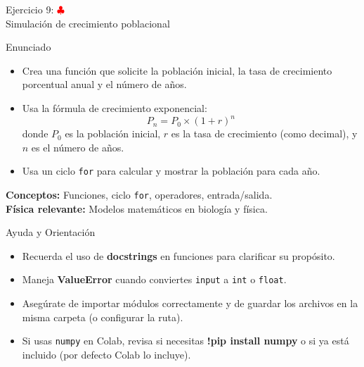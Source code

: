 \documentclass[10pt]{beamer}
\begin{document}

\begin{frame}{Ejercicio 9: \hfill \textcolor{red}{$\clubsuit$} \\ Simulación de crecimiento poblacional}
  \begin{block}{Enunciado}
    \begin{itemize}
      \item Crea una función que solicite la población inicial, la tasa de crecimiento porcentual anual y el número de años.
      \item Usa la fórmula de crecimiento exponencial:
        \[
        P_{n} = P_0 \times (1 + r)^n
        \]
        donde \(P_0\) es la población inicial, \(r\) es la tasa de crecimiento (como decimal), y \(n\) es el número de años.
      \item Usa un ciclo \texttt{for} para calcular y mostrar la población para cada año.
    \end{itemize}
  \end{block}
  \textbf{Conceptos:} Funciones, ciclo \texttt{for}, operadores, entrada/salida.\\
  \textbf{Física relevante:} Modelos matemáticos en biología y física.
\end{frame}

\begin{frame}{Ayuda y Orientación}
  \begin{itemize}
    \item Recuerda el uso de \textbf{docstrings} en funciones para clarificar su propósito.
    \item Maneja \textbf{ValueError} cuando conviertes \texttt{input} a \texttt{int} o \texttt{float}.
    \item Asegúrate de importar módulos correctamente y de guardar los archivos en la misma carpeta (o configurar la ruta).
    \item Si usas \texttt{numpy} en Colab, revisa si necesitas \textbf{!pip install numpy} o si ya está incluido (por defecto Colab lo incluye).
  \end{itemize}
\end{frame}
\end{document}
